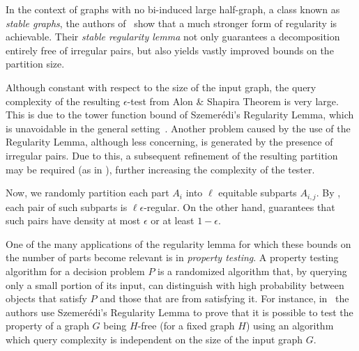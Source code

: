     In the context of graphs with no bi-induced large half-graph, a class known as \emph{stable graphs},
    the authors of~\cite{regularity_lemmas_for_stable_graphs} show that a much stronger form
    of regularity is achievable.
    Their \emph{stable regularity lemma} not only guarantees a decomposition entirely free of irregular pairs, but also yields
    vastly improved bounds on the partition size.


    Although constant with respect to the size of the input graph, the query complexity of the resulting $\epsilon$-test
    from Alon \& Shapira Theorem is very large.
    This is due to the tower function bound of Szemer\'edi's Regularity Lemma, which is unavoidable in the general
    setting~\cite{lower_bounds_of_tower_type_for_szeremedis_uniformity_lemma}.
    Another problem caused by the use of the Regularity Lemma, although less concerning, is generated by the presence of
    irregular pairs.
    Due to this, a subsequent refinement of the resulting partition may be required
    (as in \cite{regularity_lemmas_for_stable_graphs}), further increasing the complexity of the tester.


    Now, we randomly partition each part $A_i$ into $\ell$ equitable subparts $A_{i,j}$.
    By , each pair of such subparts is $\ell \epsilon$-regular.
    On the other hand,  guarantees that such pairs have density
    at most $\epsilon$ or at least $1 - \epsilon$.


    One of the many applications of the regularity lemma for which these bounds on the number of parts become relevant is in
    \emph{property testing}.
    A property testing algorithm for a decision problem $P$ is a randomized algorithm that, by querying only a small portion
    of its input, can distinguish with high probability between objects that satisfy $P$ and those that are  from
    satisfying it.
    For instance, in~\cite{efficient_testing_of_large_graphs} the authors use Szemer\'edi's Regularity Lemma
    to prove that it is possible to test the property of a graph $G$ being $H$-free (for a fixed graph $H$) using an algorithm
    which query complexity is independent on the size of the input graph $G$.


